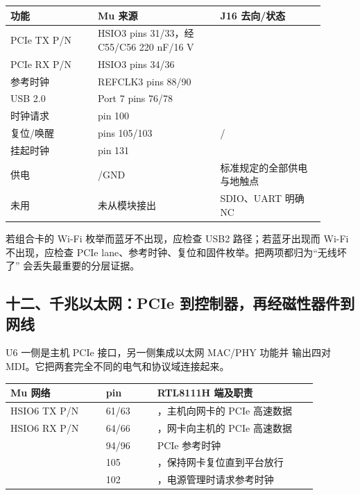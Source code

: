 \begin{longtable}{L{0.25\linewidth}L{0.35\linewidth}L{0.30\linewidth}}
\toprule
功能 & Mu 来源 & J16 去向/状态 \\
\midrule
PCIe TX P/N & HSIO3 pins 31/33，经 C55/C56 220 nF/16 V &  \\
PCIe RX P/N & HSIO3 pins 34/36 &  \\
参考时钟 & REFCLK3 pins 88/90 &  \\
USB 2.0 & Port 7 pins 76/78 &  \\
时钟请求 &  pin 100 &  \\
复位/唤醒 & pins 105/103 & / \\
挂起时钟 &  pin 131 &  \\
供电 & /GND & 标准规定的全部供电与地触点 \\
未用 & 未从模块接出 & SDIO、UART 明确 NC \\
\bottomrule
\end{longtable}

若组合卡的 Wi-Fi 枚举而蓝牙不出现，应检查 USB2 路径；若蓝牙出现而 Wi-Fi
不出现，应检查 PCIe lane、参考时钟、复位和固件枚举。把两项都归为“无线坏了”
会丢失最重要的分层证据。

\subsection{十二、千兆以太网：PCIe 到控制器，再经磁性器件到网线}


U6  一侧是主机 PCIe 接口，另一侧集成以太网 MAC/PHY 功能并
输出四对 MDI。它把两套完全不同的电气和协议域连接起来。

\begin{longtable}{L{0.28\linewidth}L{0.15\linewidth}L{0.47\linewidth}}
\toprule
Mu 网络 & pin & RTL8111H 端及职责 \\
\midrule
HSIO6 TX P/N & 61/63 & ，主机向网卡的 PCIe 高速数据 \\
HSIO6 RX P/N & 64/66 & ，网卡向主机的 PCIe 高速数据 \\
 & 94/96 & PCIe 参考时钟 \\
 & 105 & ，保持网卡复位直到平台放行 \\
 & 102 & ，电源管理时请求参考时钟 \\
\bottomrule
\end{longtable}

